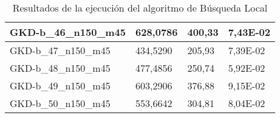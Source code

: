 \begin{table}[!ht]
\begin{adjustbox}{height=12cm}
\begin{tabular}{|l|l|l|l|}
        GKD-b\_46\_n150\_m45 & 628,0786 & 400,33 & 7,43E-02 \\ \hline
        GKD-b\_47\_n150\_m45 & 434,5290 & 205,93 & 7,39E-02 \\ \hline
        GKD-b\_48\_n150\_m45 & 477,4856 & 250,74 & 5,92E-02 \\ \hline
        GKD-b\_49\_n150\_m45 & 603,2906 & 376,88 & 9,15E-02 \\ \hline
        GKD-b\_50\_n150\_m45 & 553,6642 & 304,81 & 8,04E-02 \\ \hline
    \end{tabular}
    \end{adjustbox}
    \caption{Resultados de la ejecución del algoritmo de Búsqueda Local}
\end{table}

\pagebreak